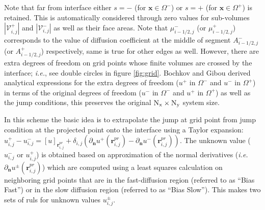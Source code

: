\documentclass{elsarticle}
\begin{document}
Note that far from interface either $s=-$ (for $\mathbf{x}\in \Omega^-$) or $s=+$ (for $\mathbf{x}\in \Omega^+$) is retained. This is automatically considered through zero values for sub-volumes $|\mathcal{V}_{i,j}^+|$ and $|\mathcal{V}_{i,j}^-|$ as well as their face areas. Note that $\mu_{i-1/2,j}^-$ (or $\mu_{i-1/2,j}^+$) corresponds to the value of diffusion coefficient at the middle of segment $A^-_{i-1/2,j}$ (or $A^+_{i-1/2,j}$) respectively, same is true for other edges as well. However, there are extra degrees of freedom on grid points whose finite volumes are crossed by the interface; \textit{i.e.}, see double circles in figure \ref{fig:grid}. Bochkov and Gibou derived analytical expressions for the extra degrees of freedom ($u^+$ in $\Omega^-$ and $u^-$ in $\Omega^+$) in terms of the original degrees of freedom ($u^-$ in $\Omega^-$ and $u^+$ in $\Omega^+$) as well as the jump conditions, this preserves the original $\rm N_x \times N_y$ system size. 

In this scheme the basic idea is to extrapolate the jump at grid point from jump condition at the projected point onto the interface using a Taylor expansion: $u^+_{i,j} - u^-_{i,j}=[u]_{\mathbf{r}_{i,j}^{pr}} + \delta_{i,j}(\partial_\mathbf{n}u^+(\mathbf{r}^{pr}_{i,j}) - \partial_\mathbf{n}u^-(\mathbf{r}^{pr}_{i,j})) $. The unknown value ($u^-_{i,j}$ or $u^+_{i,j}$) is obtained based on approximation of the normal derivatives (\textit{i.e.} $\partial_\mathbf{n}u^\pm(\mathbf{r}^{pr}_{i,j})$) which are computed using a least squares calculation on neighboring grid points that are in the fast-diffusion region (referred to as ``Bias Fast'') or in the slow diffusion region (referred to as ``Bias Slow''). This makes two sets of ruls for unknown values $u^\pm_{i,j}$. 
\end{document}

